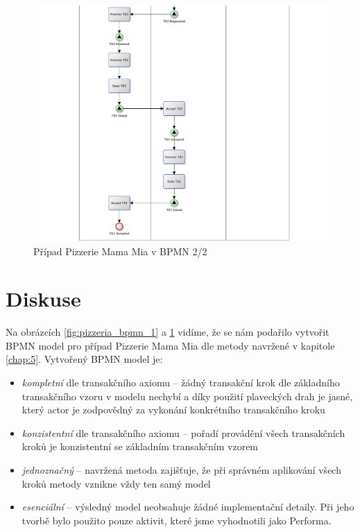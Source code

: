 \begin{center}
\begin{figure}[H]
\centerline{\includegraphics[width=1.28\textwidth,height=\textheight,keepaspectratio]{obrazky/pizzeria-bpmn-2}}
\caption{Případ Pizzerie Mama Mia v BPMN 2/2}
\label{fig:pizzeria_bpmn_2}
\end{figure}
\end{center}

\section{Diskuse}
Na obrázcích \ref{fig:pizzeria_bpmn_1} a \ref{fig:pizzeria_bpmn_2} vidíme, že se nám podařilo vytvořit BPMN model pro případ Pizzerie Mama Mia dle metody navržené v kapitole \ref{chap:5}. Vytvořený BPMN model je:

\begin{itemize}
\item \textit{kompletní} dle transakčního axiomu – žádný transakční krok dle základního transakčního vzoru v modelu nechybí a díky použití plaveckých drah je jasné, který actor je zodpovědný za vykonání konkrétního transakčního kroku
\item \textit{konzistentní} dle transakčního axiomu – pořadí provádění všech transakčních kroků je konzistentní se základním transakčním vzorem
\item \textit{jednoznačný} – navržená metoda zajišťuje, že při správném aplikování všech kroků metody vznikne vždy ten samý model
\item \textit{esenciální} – výsledný model neobsahuje žádné implementační detaily. Při jeho tvorbě bylo použito pouze aktivit, které jsme vyhodnotili jako Performa.
\end{itemize}

